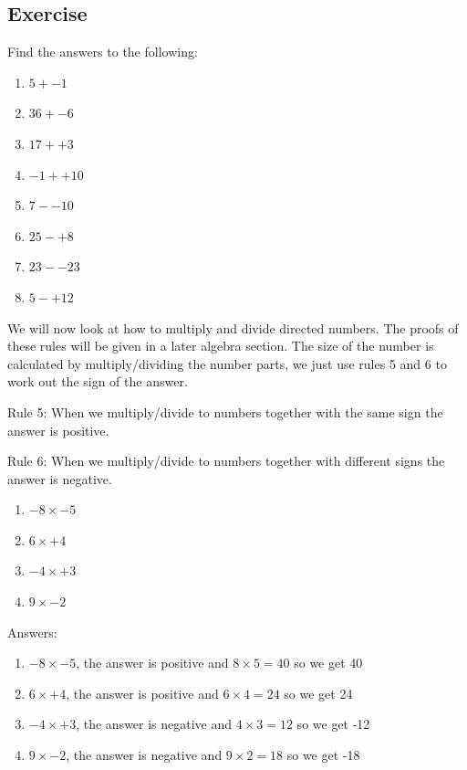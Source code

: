 \subsection{Exercise}
Find the answers to the following:
\begin{multicols}{2}
\begin{enumerate}
	\item $5 + -1$
	\item $36 + -6$
	\item $17 + +3$
	\item $-1 + +10$
	\item $7 - -10$
	\item $25 - +8$
	\item $23 - -23$
	\item $5 - +12$
\end{enumerate}
\end{multicols}

We will now look at how to multiply and divide directed numbers.
The proofs of these rules will be given in a later algebra section.
The size of the number is calculated by multiply/dividing the number parts, we just use rules 5 and 6 to work out the sign of the answer.

\bigskip

Rule 5: When we multiply/divide to numbers together with the same sign the answer is positive.

\bigskip

Rule 6: When we multiply/divide to numbers together with different signs the answer is negative.

\bigskip

\begin{exmp}
\begin{enumerate}
	\item $-8 \times -5$
	\item $6 \times +4$
	\item $-4 \times +3$
	\item $9 \times -2$
\end{enumerate}

Answers:
\begin{enumerate}
	\item $-8 \times -5$, the answer is positive and $8 \times 5 = 40$ so we get 40
	\item $6 \times +4$, the answer is positive and $6 \times 4 = 24$ so we get 24
	\item $-4 \times +3$, the answer is negative and $4 \times 3 = 12$ so we get -12
	\item $9 \times -2$, the answer is negative and $9 \times 2 = 18$ so we get -18
\end{enumerate}
\end{exmp}

